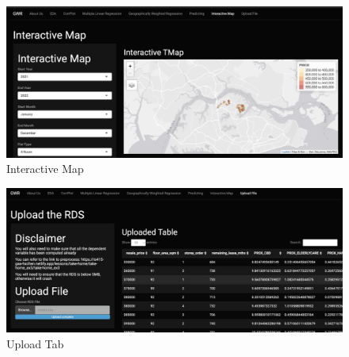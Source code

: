 \documentclass[manuscript,screen]{acmart}
\begin{document}
\begin{figure}

{\centering \includegraphics{images/Screenshot 2023-04-15 at 12.06.50 AM.png}

}

\caption{\label{fig-7}Interactive Map}

\end{figure}

\begin{figure}

{\centering \includegraphics{images/Screenshot 2023-04-14 at 11.20.47 PM.png}

}

\caption{\label{fig-8}Upload Tab}

\end{figure}
\end{document}
